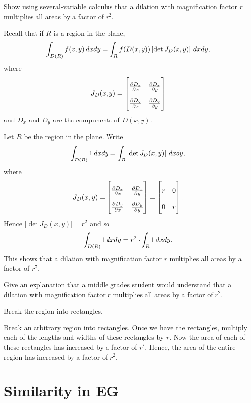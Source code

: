 \documentclass{ximera}
\begin{document}
\begin{question}
Show using several-variable calculus that a dilation with
magnification factor $r$ multiplies all areas by a factor of $r^{2}$.
\begin{solution}
\begin{hint}
Recall that if $R$ is a region in the plane, 
\[
\int_{D(R)} f(x,y)  \,d xdy = \int_{R} f(D(x,y)) \left|\det J_D(x,y)\right| \,d xdy,
\]
where
\[
J_D(x,y) =
{\renewcommand\arraystretch{2}
\begin{bmatrix}
\pp[D_x]{x} & \pp[D_x]{y} \\
\pp[D_y]{x} & \pp[D_y]{y}
\end{bmatrix}}
\]
and $D_x$ and $D_y$ are the components of $D(x,y)$.
\end{hint}
Let $R$ be the region in the plane. Write
\[
\int_{D(R)} 1  \,d xdy = \int_{R}  \left|\det J_D(x,y)\right| \,d xdy,
\]
where
\[
J_D(x,y) =
{\renewcommand\arraystretch{2}
\begin{bmatrix}
\pp[D_x]{x} & \pp[D_x]{y} \\
\pp[D_y]{x} & \pp[D_y]{y}
\end{bmatrix}} = 
\begin{bmatrix}
r & 0 \\
0 & r
\end{bmatrix}.
\]
Hence $\left|\det J_D(x,y)\right| = r^2$ and so 
\[
\int_{D(R)} 1  \,d xdy = r^2\cdot \int_R 1\,d xdy.
\]
This shows that a dilation with magnification factor $r$ multiplies
all areas by a factor of $r^{2}$.
\end{solution}
\end{question}

\begin{question}
Give an explanation that a middle grades student would understand that
a dilation with magnification factor $r$ multiplies all areas by a
factor of $r^{2}$.
\begin{solution}
\begin{hint}
Break the region into rectangles. 
\end{hint}
Break an arbitrary region into rectangles. Once we have the
rectangles, multiply each of the lengths and widths of these
rectangles by $r$. Now the area of each of these rectangles has
increased by a factor of $r^2$. Hence, the area of the entire region
has increased by a factor of $r^2$.
\end{solution}
\end{question}



\section*{Similarity in \textbf{EG}}
\end{document}
